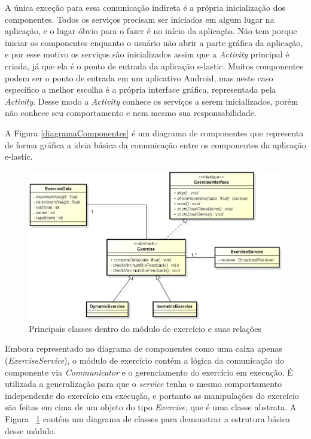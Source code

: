 A única exceção para essa comunicação indireta é a própria inicialização dos componentes. Todos os serviços precisam ser iniciados em algum lugar na aplicação, e o lugar óbvio para o fazer é no início da aplicação. Não tem porque iniciar os componentes enquanto o usuário não abrir a parte gráfica da aplicação, e por esse motivo os serviços são inicializados assim que a \textit{Activity} principal é criada, já que ela é o ponto de entrada da aplicação e-lastic. Muitos componentes podem ser o ponto de entrada em um aplicativo Android, mas neste caso específico a melhor escolha é a própria interface gráfica, representada pela \textit{Activity}. Desse modo a \textit{Activity} conhece os serviços a serem inicializados, porém não conhece seu comportamento e nem mesmo sua responsabilidade.

A Figura \ref{diagramaComponentes} é um diagrama de componentes que representa de forma gráfica a ideia básica da comunicação entre os componentes da aplicação e-lastic.

\begin{figure}[!htb]
\centering
\includegraphics [keepaspectratio=true,scale=0.60]{figuras/diagramaExercicios.eps}
\caption{Principais classes dentro do módulo de exercício e suas relações}
\label{diagramaExercicios}
\end{figure}

Embora representado no diagrama de componentes como uma caixa apenas (\textit{ExerciseService}), o módulo de exercício contém a lógica da comunicação do componente via \textit{Communicator} e o gerenciamento do exercício em execução. É utilizada a generalização para que o \textit{service} tenha o mesmo comportamento independente do exercício em execução, e portanto as manipulações do exercício são feitas em cima de um objeto do tipo \textit{Exercise}, que é uma classe abstrata. A Figura ~\ref{diagramaExercicios} contém um diagrama de classes para demonstrar a estrutura básica desse módulo.

